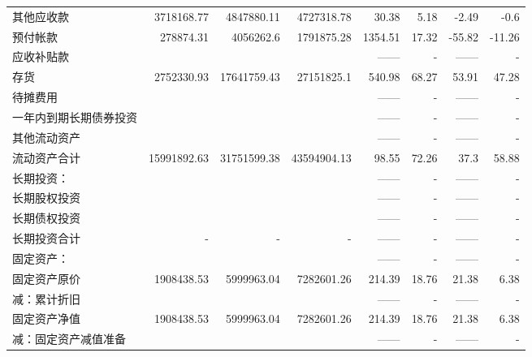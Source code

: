 \begin{longtable}{>{\scriptsize}p{9em}>{\scriptsize}r>{\scriptsize}r>{\scriptsize}r>{\scriptsize}r>{\scriptsize}r>{\scriptsize}r>{\scriptsize}r}
\hspace{2ex}	    其他应收款	&	3718168.77	&	4847880.11	&	4727318.78	&	30.38	&	5.18	&	-2.49	&	-0.6	\\
\hspace{2ex}	    预付帐款	&	278874.31	&	4056262.6	&	1791875.28	&	1354.51	&	17.32	&	-55.82	&	-11.26	\\
\hspace{2ex}	    应收补贴款	&		&		&		&	——	&	- 	&	——	&	- 	\\
\hspace{2ex}	    存货	&	2752330.93	&	17641759.43	&	27151825.1	&	540.98	&	68.27	&	53.91	&	47.28	\\
\hspace{2ex}	    待摊费用	&		&		&		&	——	&	- 	&	——	&	- 	\\
\hspace{2ex}	    一年内到期长期债券投资	&		&		&		&	——	&	- 	&	——	&	- 	\\
\hspace{2ex}	    其他流动资产	&		&		&		&	——	&	- 	&	——	&	- 	\\ 
\hspace{2ex}	      流动资产合计	&	15991892.63	&	31751599.38	&	43594904.13	&	98.55	&	72.26	&	37.3	&	58.88	\\
\midrule
\hspace{2ex}	长期投资：	&		&		&		&	——	&	- 	&	——	&	- 	\\
\hspace{2ex}	    长期股权投资	&		&		&		&	——	&	- 	&	——	&	- 	\\
\hspace{2ex}	    长期债权投资	&		&		&		&	——	&	- 	&	——	&	- 	\\
\hspace{2ex}	    长期投资合计	&	- 	&	- 	&	- 	&	——	&	- 	&	——	&	- 	\\
\hspace{2ex}	固定资产：	&		&		&		&	——	&	- 	&	——	&	- 	\\
\hspace{2ex}	    固定资产原价	&	1908438.53	&	5999963.04	&	7282601.26	&	214.39	&	18.76	&	21.38	&	6.38	\\
\hspace{2ex}	        减：累计折旧	&		&		&		&	——	&	- 	&	——	&	- 	\\
\hspace{2ex}	    固定资产净值	&	1908438.53	&	5999963.04	&	7282601.26	&	214.39	&	18.76	&	21.38	&	6.38	\\
\hspace{2ex}	        减：固定资产减值准备	&		&		&		&	——	&	- 	&	——	&	- 	\\

\end{longtable}
